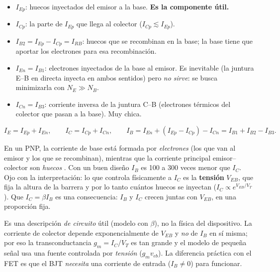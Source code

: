 \begin{itemize}
  \item $I_{Ep}$: huecos inyectados del emisor a la base. \textbf{Es la componente útil.}
  \item $I_{Cp}$: la parte de $I_{Ep}$ que llega al colector ($I_{Cp}\lesssim I_{Ep}$).
  \item $I_{B2}=I_{Ep}-I_{Cp}=I_{RB}$: huecos que se recombinan en la base; la base tiene que
  aportar los electrones para esa recombinación.
  \item $I_{En}=I_{B1}$: electrones inyectados de la base al emisor. Es inevitable (la juntura
  E--B en directa inyecta en ambos sentidos) pero \emph{no sirve}: se busca minimizarla con
  $N_E\gg N_B$.
  \item $I_{Cn}=I_{B3}$: corriente inversa de la juntura C--B (electrones térmicos del
  colector que pasan a la base). Muy chica.
\end{itemize}

\begin{clave}
\[
  I_E = I_{Ep}+I_{En},\qquad I_C = I_{Cp}+I_{Cn},\qquad
  I_B = I_{En} + (I_{Ep}-I_{Cp}) - I_{Cn} = I_{B1}+I_{B2}-I_{B3}.
\]
\end{clave}

\begin{intuicion}
En un PNP, la corriente de base está formada por \emph{electrones} (los que van al emisor y
los que se recombinan), mientras que la corriente principal emisor--colector son
\emph{huecos} . Con un buen diseño $I_B$ es 100 a 300 veces menor que $I_C$.
Ojo con la interpretación: lo que controla físicamente a $I_C$ es la \textbf{tensión}
$V_{EB}$, que fija la altura de la barrera y por lo tanto cuántos huecos se inyectan
($I_C\propto e^{V_{EB}/V_T}$). Que $I_C=\beta I_B$ es una consecuencia: $I_B$ y $I_C$ crecen
juntas con $V_{EB}$, en una proporción fija.
\end{intuicion}

\begin{ojo}
Es una descripción \emph{de circuito} útil (modelo con $\beta$), no la física del dispositivo.
La corriente de colector depende exponencialmente de $V_{EB}$ y \emph{no} de $I_B$ en sí
misma; por eso la transconductancia $g_m=I_C/V_T$ es tan grande y el modelo de pequeña señal
usa una fuente controlada por \emph{tensión} ($g_mv_{eb}$). La diferencia práctica con el FET
es que el BJT \emph{necesita} una corriente de entrada ($I_B\neq0$) para funcionar.
\end{ojo}
